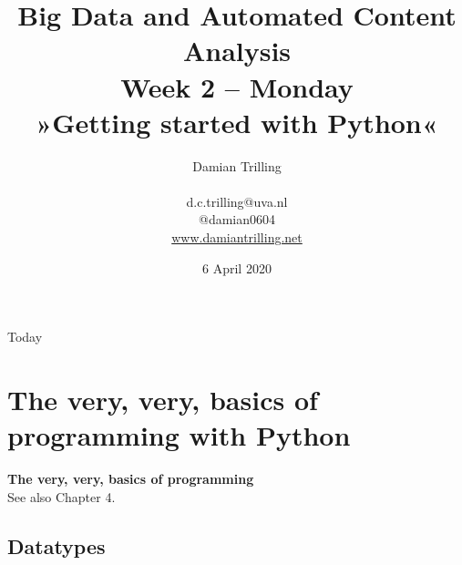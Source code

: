 \documentclass{beamer}
\begin{document}
\title[Big Data and Automated Content Analysis]{\textbf{Big Data and Automated Content Analysis} \\ Week 2 -- Monday \\ »Getting started with Python«}
\author[Damian Trilling]{Damian Trilling \\ ~ \\ \footnotesize{d.c.trilling@uva.nl \\@damian0604} \\ \url{www.damiantrilling.net}}
\date{6 April 2020}




\begin{frame}{}
\titlepage
\end{frame}

\begin{frame}{Today}
\tableofcontents
\end{frame}


\section[Basics]{The very, very, basics of programming with Python}
\begin{frame}[plain]
\textbf{The very, very, basics of programming}\\
\vspace{1cm}
See also Chapter 4.
\end{frame}
\subsection{Datatypes}
\end{document}

